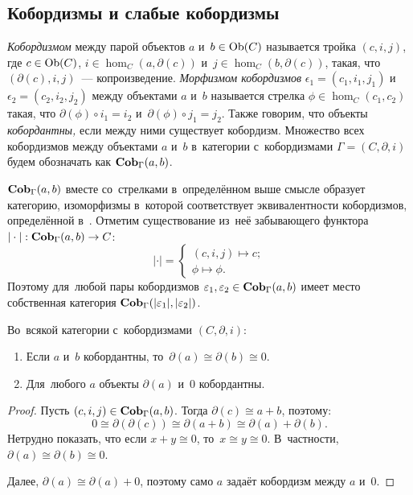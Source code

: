 \documentclass[a4paper,oneside]{article}
\begin{document}
\subsection{Кобордизмы и слабые кобордизмы}
\textit{Кобордизмом} между парой объектов $a$ и~$b \in \mathrm{Ob}(C)$ называется тройка $(c, i, j)$,
где $c \in \mathrm{Ob}(C)$, $i \in \hom_C(a, \partial(c))$ и~$j \in \hom_C(b, \partial(c))$,
такая, что $(\partial(c), i, j)$~— копроизведение. \textit{Морфизмом кобордизмов} $\epsilon_1 = (c_1, i_1, j_1)$
и~$\epsilon_2 = (c_2, i_2, j_2)$ между объектами $a$ и~$b$ называется стрелка $\phi \in \hom_C(c_1, c_2)$
такая, что $\partial(\phi) \circ i_1 = i_2$ и~$\partial(\phi) \circ j_1 = j_2$. Также говорим, что объекты \textit{кобордантны,}
если между ними существует кобордизм. Множество всех кобордизмов между объектами $a$ и~$b$ в~категории с~кобордизмами
$\Gamma = (C, \partial, i)$ будем обозначать как $\mathbf{Cob}_\Gamma(a, b)$.

$\mathbf{Cob}_\Gamma(a, b)$ вместе со~стрелками в~определённом выше смысле образует категорию,
изоморфизмы в~которой соответствует эквивалентности кобордизмов, определённой в~\cite{Mil65}.
Отметим существование из~неё забывающего функтора $|\cdot| : \mathbf{Cob}_\Gamma(a, b) \rightarrow C$:
\[
  | \cdot | = \begin{cases}
    (c, i, j) \mapsto c; \\
    \phi \mapsto \phi.
  \end{cases}
\]
Поэтому для~любой пары кобордизмов $\varepsilon_1, \varepsilon_2 \in \mathbf{Cob}_\Gamma(a, b)$
имеет место собственная категория $\mathbf{Cob}_\Gamma(|\varepsilon_1|, |\varepsilon_2|)$.

\begin{statement*}
  Во~всякой категории с~кобордизмами $(C, \partial, i)$:
  \begin{enumerate}
    \item Если $a$ и~$b$ кобордантны, то~$\partial(a) \cong \partial(b) \cong 0$.
    \item Для~любого $a$ объекты $\partial(a)$ и~$0$ кобордантны.
  \end{enumerate}
\end{statement*}

\begin{proof}
  Пусть $(c, i, j) \in \mathbf{Cob}_\Gamma(a, b)$. Тогда $\partial(c) \cong a + b$, поэтому:
  \[
    0 \cong \partial(\partial(c)) \cong \partial(a + b) \cong \partial(a) + \partial(b).
  \]
  Нетрудно показать, что если $x + y \cong 0$, то~$x \cong y \cong 0$.
  В~частности, $\partial(a) \cong \partial(b) \cong 0$.

  Далее, $\partial(a) \cong \partial(a) + 0$, поэтому само $a$ задаёт кобордизм между $a$ и~$0$.
\end{proof}
\end{document}
